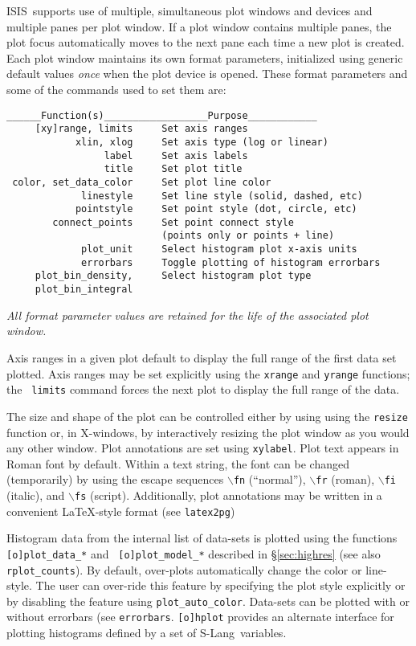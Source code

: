 \documentclass{book}
\newcommand{\isisx}{{\sc ISIS~}}
\newcommand{\slang}{{\sc S-Lang}}
\begin{document}
\isisx supports use of multiple, simultaneous plot windows and devices and
multiple panes per plot window.  If a plot window contains
multiple panes, the plot focus automatically moves to the next
pane each time a new plot is created.  Each plot window maintains
its own format parameters, initialized using generic default
values {\it once} when the plot device is opened. These format
parameters and some of the commands used to set them are:

\begin{verbatim}
______Function(s)__________________Purpose____________
     [xy]range, limits     Set axis ranges
            xlin, xlog     Set axis type (log or linear)
                 label     Set axis labels
                 title     Set plot title
 color, set_data_color     Set plot line color
             linestyle     Set line style (solid, dashed, etc)
            pointstyle     Set point style (dot, circle, etc)
        connect_points     Set point connect style
                           (points only or points + line)
             plot_unit     Select histogram plot x-axis units
             errorbars     Toggle plotting of histogram errorbars
     plot_bin_density,     Select histogram plot type
     plot_bin_integral
\end{verbatim}

{\it All format parameter values are retained for the life of
the associated plot window.}

Axis ranges in a given plot default to display the full range
of the first data set plotted. Axis ranges may be set explicitly
using the {\tt xrange} and {\tt yrange} functions; the {\tt
limits} command forces the next plot to display the full range of
the data.

The size and shape of the plot can be controlled either by using using
the {\tt resize} function or, in X-windows, by interactively resizing
the plot window as you would any other window. Plot annotations are
set using {\tt xylabel}.  Plot text appears in Roman font by default.
Within a text string, the font can be changed (temporarily) by using
the escape sequences $\backslash${\tt fn} (``normal''),
$\backslash${\tt fr} (roman), $\backslash${\tt fi} (italic), and
$\backslash${\tt fs} (script).  Additionally, plot annotations
may be written in a convenient \LaTeX-style format (see
\verb|latex2pg|)

Histogram data from the internal list of data-sets is plotted
using the functions {\tt [o]plot\_data\_*} and {\tt
[o]plot\_model\_*} described in \S\ref{sec:highres} (see also
\verb|rplot_counts|). By default, over-plots automatically change the
color or line-style. The user can over-ride this feature by
specifying the plot style explicitly or by disabling the feature
using {\tt plot\_auto\_color}. Data-sets can be plotted with or
without errorbars (see {\tt errorbars}.  {\tt [o]hplot} provides
an alternate interface for plotting histograms defined by a set of
\slang\ variables.
\end{document}
